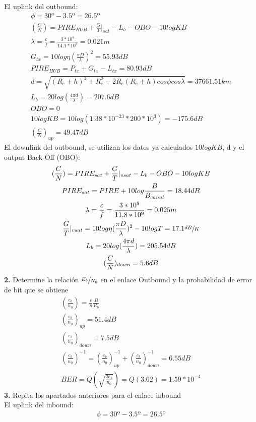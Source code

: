 \begin{exercise}[2]
	El uplink del outbound:
	\begin{gather*}
		\phi=30º-3.5º=26.5º\\
		(\frac{C}{N})=PIRE_{HUB}+\frac{G}{T}|_{sat}-L_b-OBO-10logKB\\
		\lambda=\frac{c}{f}=\frac{3*10^8}{14.1*10^9}=0.021m\\
		G_{tx}=10log\eta(\frac{\pi D}{\lambda})^2=55.93dB\\
		PIRE_{HUB}=P_{tx}+G_{tx}-L_{tx}=80.93dB\\
		d=\sqrt{(R_e+h)^2+R_e^2-2R_e(R_e+h)cos\phi cos\lambda}=37661.51km\\
		L_b=20log(\frac{4\pi d}{\lambda})=207.6dB\\
		OBO=0\\
		10logKB=10log(1.38*10^{-23}*200*10^3)=-175.6dB\\
		(\frac{C}{N})_{up}=49.47dB
	\end{gather*}
	El downlink del outbound, se utilizan los datos ya calculados $10logKB$, d y el output Back-Off (OBO):
	\begin{gather*}
		(\frac{C}{N})=PIRE_{sat}+\frac{G}{T}|_{vsat}-L_b-OBO-10logKB\\
		PIRE_{sat}=PIRE+10log\frac{B}{B_{canal}}=18.44dB\\
		\lambda=\frac{c}{f}=\frac{3*10^8}{11.8*10^9}=0.025m\\
		\frac{G}{T}|_{vsat}=10log\eta(\frac{\pi D}{\lambda})^2-10logT=17.1\sfrac{dB}{K}\\
		L_b=20log(\frac{4\pi d}{\lambda})=205.54dB\\
		(\frac{C}{N})_{down}=5.6dB
	\end{gather*}
	\textbf{2.} Determine la relación $\sfrac{E_b}{N_0}$ en el enlace Outbound y la probabilidad de error de bit que se obtiene \\
	\begin{gather*}
		(\frac{e_b}{n_0})=\frac{c}{n}\frac{B}{R_b}\\
		(\frac{e_b}{n_0})_{up}=51.4dB\\
		(\frac{e_b}{n_0})_{down}=7.5dB\\
		(\frac{e_b}{n_0})^{-1}=(\frac{e_b}{n_0})_{up}^{-1}+(\frac{e_b}{n_0})_{down}^{-1}=6.55dB\\
		BER=Q(\sqrt{\frac{2e_b}{n_0}})=Q(3.62)=1.59*10^{-4}
	\end{gather*}
	\textbf{3.} Repita los apartados anteriores para el enlace inbound\\
	El uplink del inbound:
	\begin{gather*}
		\phi=30º-3.5º=26.5º\\

\end{gather*}
\end{exercise}
